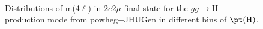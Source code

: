 \begin{figure}[htb]
\begin{center}
    \\
    \caption{ Distributions of m(4$\ell$) in $2e2\mu$ final state for the $gg\rightarrow \mathrm{H}$ production mode from {\sc powheg+JHUGen} in different bins of $\pt(\mathrm{H})$.
    }
  \label{fig:sigfits-pT4l-ggH-powheg15-JHUgen-125-maintext}
 \end{center}
\end{figure} \clearpage

